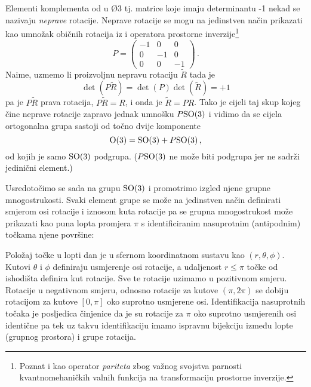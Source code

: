 Elementi komplementa od  u \O{3} tj. matrice koje imaju determinantu -1 nekad se 
nazivaju \emph{neprave} rotacije.
Neprave rotacije se mogu na jedinstven
način prikazati kao umnožak običnih rotacija iz  i operatora 
prostorne inverzije\footnote{Poznat i kao operator \emph{pariteta} zbog
    važnog svojstva parnosti kvantnomehaničkih valnih funkcija na transformaciju
prostorne inverzije.}
\begin{equation}
P = \begin{pmatrix}
-1 & 0 & 0 \\ 
0  &-1 & 0 \\
0  & 0 & -1
\end{pmatrix} \,.
\end{equation}
Naime, uzmemo li proizvoljnu nepravu rotaciju $\tilde{R}$ tada
je 
\begin{equation}
\det (P \tilde{R}) = \det(P) \det(\tilde{R}) = +1     
\end{equation}
pa je $P\tilde{R}$ 
prava rotacija, $P\tilde{R} = R$,
i onda je $\tilde{R} = P R$. Tako je cijeli taj skup
kojeg čine neprave rotacije zapravo jednak umnošku $P\mathrm{SO}(3)$ i vidimo da
se cijela ortogonalna grupa sastoji od točno dvije komponente
\begin{equation}
    \mathrm{O}(3) = \mathrm{SO}(3) + P\mathrm{SO}(3)\,,
    \label{eq:so3Pso3}
\end{equation}
od kojih je samo $\mathrm{SO}(3)$ podgrupa. ($P\mathrm{SO}(3)$ ne može biti podgrupa jer ne sadrži
jedinični element.)

Usredotočimo se sada na grupu $\mathrm{SO}(3)$ i promotrimo izgled njene grupne mnogostrukosti.
Svaki element grupe  se može na jedinstven način definirati
smjerom osi rotacije i iznosom kuta rotacije pa se grupna mnogostrukost
može prikazati kao puna lopta promjera $\pi$ s identificiranim nasuprotnim
(antipodnim) točkama njene površine:

\centerline{}

Položaj točke u lopti dan je u sfernom koordinatnom sustavu kao
$(r, \theta, \phi)$. Kutovi $\theta$ i $\phi$ definiraju usmjerenje
osi rotacije, a udaljenost $r \le \pi$ točke od ishodišta definira kut rotacije.
Sve te rotacije uzimamo u pozitivnom smjeru. Rotacije u negativnom smjeru,
odnosno rotacije za 
kutove $(\pi, 2\pi)$ se dobiju rotacijom za kutove $[0, \pi]$ oko
suprotno usmjerene osi. Identifikacija nasuprotnih točaka je posljedica
činjenice da je su rotacije za $\pi$ oko suprotno usmjerenih osi
identične pa tek uz takvu identifikaciju imamo ispravnu bijekciju
između lopte (grupnog prostora) i  grupe rotacija. 

